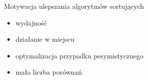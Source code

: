 \begin{frame}[squeeze]{Motywacja ulepszania algorytmów sortujących}

	\begin{itemize}
		\item wydajność
		\item działanie w miejscu
		\item optymalizacja przypadku pesymistycznego
		\item mała liczba porównań
	\end{itemize}

\end{frame}
